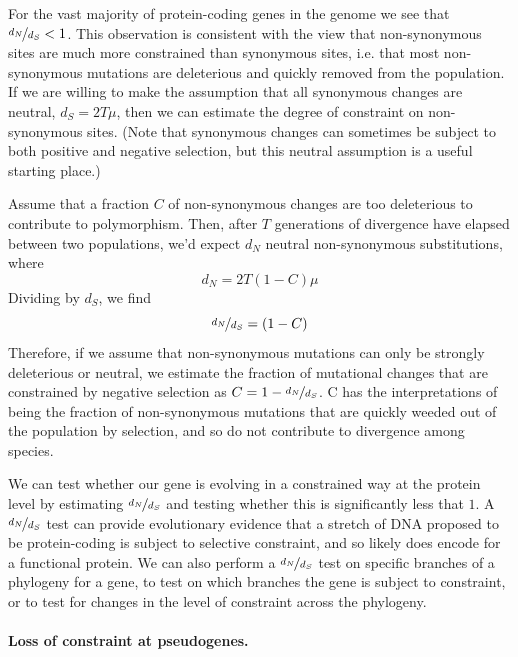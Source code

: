 For the vast majority of protein-coding genes in the genome we see that $\nicefrac{d_N}{d_S} < 1$. This observation is consistent with the view
that non-synonymous sites are much more constrained than synonymous sites, i.e. that most non-synonymous mutations are deleterious and quickly removed from the population. If we are willing to make the assumption that all synonymous changes are
neutral, $d_S=2T \mu$, then we can estimate the degree of constraint on non-synonymous sites. (Note that synonymous changes can sometimes be subject to
both positive and negative selection, but this neutral assumption is a useful starting place.)

Assume that a fraction $C$ of non-synonymous changes are too
deleterious to contribute to polymorphism. Then, after $T$ generations of divergence have
elapsed between two populations, we'd expect $d_N$ neutral non-synonymous substitutions, where
\begin{equation}
d_N = 2T (1-C) \mu
\end{equation}
Dividing by $d_S$, we find
\begin{equation}
\nicefrac{d_N}{d_S} = (1-C)
\end{equation}
Therefore, if we assume that non-synonymous mutations can only be
strongly deleterious or neutral, we estimate the fraction of mutational changes that
are constrained by negative selection as $C= 1- \nicefrac{d_N}{d_S}$. C has the
interpretations of being the fraction of non-synonymous mutations that are quickly weeded out of the population by selection, and so do not contribute to divergence among species.

We can test whether our gene is evolving in a constrained way at the protein level by estimating $\nicefrac{d_N}{d_S}$ and testing whether this is significantly less that  $1$. A $\nicefrac{d_N}{d_S}$ test can provide evolutionary evidence that a stretch of DNA proposed to be protein-coding is subject to selective constraint, and so likely does encode for a functional protein. We can also perform a $\nicefrac{d_N}{d_S}$ test on specific branches of a phylogeny for a gene, to test on which branches the gene is subject to constraint, or to test for changes in the level of constraint across the phylogeny.


\paragraph{Loss of constraint at pseudogenes.}



